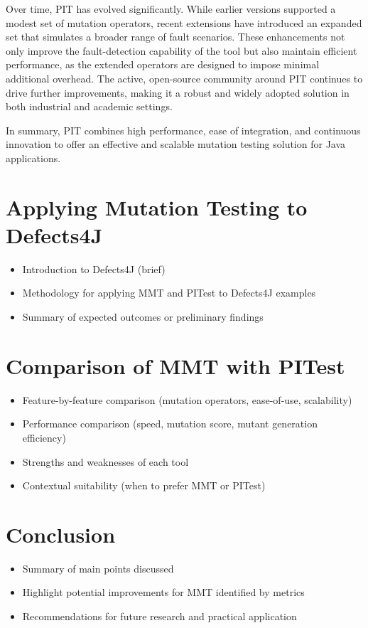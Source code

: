 \documentclass[sigplan, nonacm]{acmart}
\begin{document}
Over time, PIT has evolved significantly. While earlier versions supported a
modest set of mutation operators, recent extensions have introduced an
expanded set that simulates a broader range of fault scenarios. These
enhancements not only improve the fault-detection capability of the tool but
also maintain efficient performance, as the extended operators are designed
to impose minimal additional overhead. The active, open-source community
around PIT continues to drive further improvements, making it a robust and
widely adopted solution in both industrial and academic settings.

In summary, PIT combines high performance, ease of integration, and continuous
innovation to offer an effective and scalable mutation testing solution for
Java applications.

\section{Applying Mutation Testing to Defects4J}
\begin{itemize}
	\item Introduction to Defects4J (brief)
	\item Methodology for applying MMT and PITest to Defects4J examples
	\item Summary of expected outcomes or preliminary findings
\end{itemize}

\section{Comparison of MMT with PITest}
\begin{itemize}
	\item Feature-by-feature comparison (mutation operators, ease-of-use,
	      scalability)
	\item Performance comparison (speed, mutation score, mutant generation
	      efficiency)
	\item Strengths and weaknesses of each tool
	\item Contextual suitability (when to prefer MMT or PITest)
\end{itemize}

\section{Conclusion}
\begin{itemize}
	\item Summary of main points discussed
	\item Highlight potential improvements for MMT identified by metrics
	\item Recommendations for future research and practical application
\end{itemize}

\vfill
\balance


\end{document}
